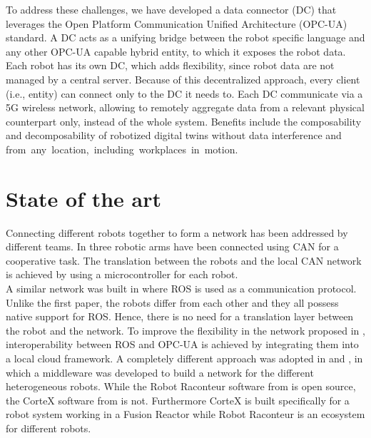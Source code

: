 \documentclass[conference]{IEEEtran}
\begin{document}
 
To address these challenges, we have developed a data connector (DC) that leverages the Open Platform Communication Unified Architecture (OPC-UA) standard.
A DC acts as a unifying bridge between the robot specific language and any other OPC-UA capable hybrid entity, to which it exposes the robot data. Each robot has its own DC, which 
 adds flexibility, since  robot data are not managed by a central server.
Because of this decentralized approach, every client (i.e., entity) can connect only to the DC it needs to. Each DC  communicate via a 5G wireless network, allowing to remotely aggregate data  from  a relevant physical counterpart only,  instead of the whole system. Benefits include the  composability and decomposability of robotized digital twins without data interference and \mbox{from any location, including workplaces in motion.} 
\section{State of the art}
Connecting  different robots together  to form a network has been addressed by different teams.
In \cite{SotaCAN} three robotic arms have been connected using CAN for a cooperative task.
The translation between the robots and the local CAN network is achieved by using a microcontroller for each robot.\\
A similar network was built in \cite{SotaROS} where ROS is used as a communication protocol.
Unlike the first paper, the robots differ from each other and they all possess native support for ROS. Hence,  there is no need for a translation layer between the robot and the network. To improve the flexibility in  the network proposed in \cite{StoaROStoOPCUA},  interoperability between ROS and  OPC-UA is achieved by integrating them into a local cloud framework. A completely different approach was adopted in \cite{SotaRaconteur} and \cite{SotaFusion}, in which
a middleware was developed to build a network for the different heterogeneous robots.
While the Robot Raconteur software from \cite{SotaRaconteur} is open source, the CorteX software from \cite{SotaFusion} is not.
Furthermore CorteX is built specifically for a robot system working in a Fusion Reactor while Robot Raconteur is an ecosystem for different robots.
\end{document}

